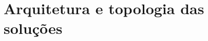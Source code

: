 \documentclass[12pt]{article}
\begin{document}
%

\section{Arquitetura e topologia das soluções}

\end{document}
